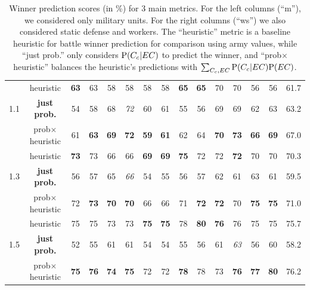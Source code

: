 \begin{table}[h]
\begin{center}
\begin{small}
\begin{tabular}{|c|c|cc|cc|cc|cc|cc|cc|c|}
& heuristic & \textbf{63} & 63 & 58 & 58 & 58 & 58 & \textbf{65} & \textbf{65} & 70 & 70 & 56 & 56 & 61.7 \\
1.1     & \textbf{just prob.} & 54 & 58 & 68 & \textit{72} & 60 & 61 & 55 & 56 & 69 & 69 & 62 & 63 & 63.2 \\ 
    & prob$\times$heuristic & 61 & \textbf{63} & \textbf{69} & \textbf{72} & \textbf{59} & \textbf{61} & 62 & 64 & \textbf{70} & \textbf{73} & \textbf{66} & \textbf{69} & 67.0 \\
\hline
& heuristic & \textbf{73} & 73 & 66 & 66 & \textbf{69} & \textbf{69} & \textbf{75} & 72 & 72 & \textbf{72} & 70 & 70 & 70.3 \\
1.3     & \textbf{just prob.} & 56 & 57 & 65 & \textit{66} & 54 & 55 & 56 & 57 & 62 & 61 & 63 & 61 & 59.5 \\
    & prob$\times$heuristic & 72 & \textbf{73} & \textbf{70} & \textbf{70} & 66 & 66 & 71 & \textbf{72} & \textbf{72} & 70 & \textbf{75} & \textbf{75} & 71.0 \\
\hline
& heuristic & 75 & 75 & 73 & 73 & \textbf{75} & \textbf{75} & 78 & \textbf{80} & \textbf{76} & 76 & 75 & 75 & 75.7 \\
1.5     & \textbf{just prob.} & 52 & 55 & 61 & 61 & 54 & 54 & 55 & 56 & 61 & \textit{63} & 56 & 60 & 58.2 \\
    & prob$\times$heuristic & \textbf{75} & \textbf{76} & \textbf{74} & \textbf{75} & 72 & 72 & \textbf{78} & 78 & 73 & \textbf{76} & \textbf{77} & \textbf{80} & 76.2 \\
\hline
\end{tabular}
\end{small}
\caption{Winner prediction scores (in \%) for 3 main metrics. For the left columns (``m''), we considered only military units. For the right columns (``ws'') we also considered static defense and workers. The ``heuristic'' metric is a baseline heuristic for battle winner prediction for comparison using army values, while ``just prob.'' only considers $\mathrm{P}(C_c|EC)$ to predict the winner, and ``prob$\times$heuristic'' balances the heuristic's predictions with $\sum_{C_c,EC}\mathrm{P}(C_c|EC)\mathrm{P}(EC)$.}
\label{tab:openingsresults}
\end{center}
\end{table}


